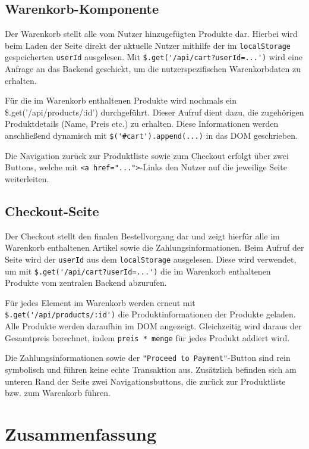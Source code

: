 \documentclass[oneside]{ausarbeitung}
\begin{document}
\subsection{Warenkorb-Komponente}

Der Warenkorb stellt alle vom Nutzer hinzugefügten Produkte dar. Hierbei wird beim Laden der Seite direkt der aktuelle Nutzer mithilfe der im \texttt{localStorage} gespeicherten \texttt{userId} ausgelesen. Mit \verb|$.get('/api/cart?userId=...')| wird eine Anfrage an das Backend geschickt, um die nutzerspezifischen Warenkorbdaten zu erhalten.

Für die im Warenkorb enthaltenen Produkte wird nochmals ein \$.get('/api/products/:id') durchgeführt. Dieser Aufruf dient dazu, die zugehörigen Produktdetails (Name, Preis etc.) zu erhalten. Diese Informationen werden anschließend dynamisch mit \verb|$('#cart').append(...)| in das DOM geschrieben.

Die Navigation zurück zur Produktliste sowie zum Checkout erfolgt über zwei Buttons, welche mit \texttt{<a href="...">}-Links den Nutzer auf die jeweilige Seite weiterleiten.


\subsection{Checkout-Seite}

Der Checkout stellt den finalen Bestellvorgang dar und zeigt hierfür alle im Warenkorb enthaltenen Artikel sowie die Zahlungsinformationen. Beim Aufruf der Seite wird der \texttt{userId} aus dem \texttt{localStorage} ausgelesen. Diese wird verwendet, um mit \verb|$.get('/api/cart?userId=...')| die im Warenkorb enthaltenen Produkte vom zentralen Backend abzurufen. 

Für jedes Element im Warenkorb werden erneut mit \verb|$.get('/api/products/:id')| die Produktinformationen der Produkte geladen. Alle Produkte werden daraufhin im DOM angezeigt. Gleichzeitig wird daraus der Gesamtpreis berechnet, indem \texttt{preis * menge} für jedes Produkt addiert wird. 

Die Zahlungsinformationen sowie der \texttt{"Proceed to Payment"}-Button sind rein symbolisch und führen keine echte Transaktion aus. Zusätzlich befinden sich am unteren Rand der Seite zwei Navigationsbuttons, die zurück zur Produktliste bzw. zum Warenkorb führen.

\section{Zusammenfassung}
\end{document}
